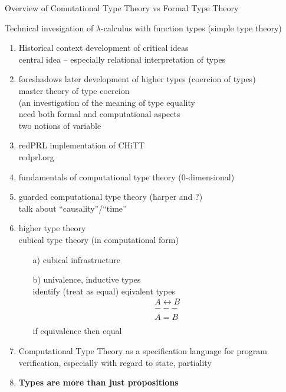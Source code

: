 \documentclass{article}
\begin{document}
{}

{}

Overview of Comutational Type Theory vs Formal Type Theory

Technical invesigation of $\lambda$-calculus with function types
(simple type theory)

\begin{enumerate}
\item Historical context development of critical ideas\\
  central idea -- especially relational interpretation of types
\item foreshadows later development of higher types (coercion of types)\\
master theory of type coercion\\
(an investigation of the meaning of type equality\\
need both formal and computational aspects\\
two notions of variable
\item redPRL implementation of CHiTT\\
redprl.org
\item fundamentals of computational type theory (0-dimensional)
\item guarded computational type theory (harper and ?)\\
talk about ``causality''/``time''
\item higher type theory\\
cubical type theory (in computational form)\\
\begin{itemize}
\item[a)] cubical infrastructure
\item[b)] univalence, inductive types\\
identify (treat as equal) eqivalent types
\[\begin{array}{c}
A\leftrightarrow B\\
---\\
A = B\\
\end{array}\]
if equivalence then equal
\end{itemize}
\item Computational Type Theory as a specification language for
program verification, especially with regard to state, partiality
\item {\bf Types are more than just propositions}\\

\end{enumerate}
\end{document}

